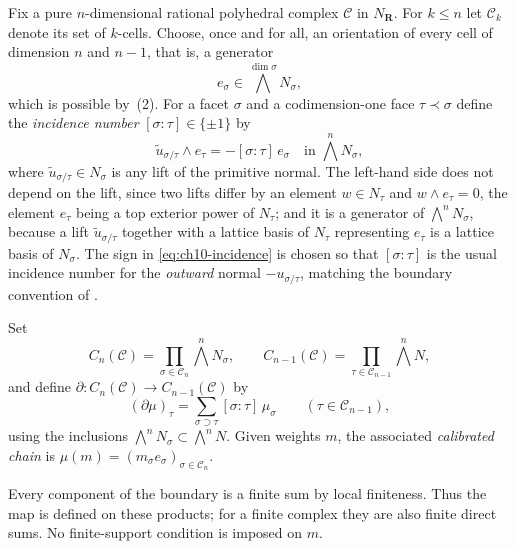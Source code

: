 Fix a pure $n$-dimensional rational polyhedral complex $\mathscr C$ in
$N_{\mathbf R}$.  For $k\leq n$ let $\mathscr C_k$ denote its set of
$k$-cells.  Choose, once and for all, an orientation of every cell of
dimension $n$ and $n-1$, that is, a generator
\[
                  e_\sigma\in\textstyle\bigwedge^{\dim\sigma}N_\sigma,
\]
which is possible by \,(2).  For a facet
$\sigma$ and a codimension-one face $\tau\prec\sigma$ define the
\emph{incidence number} $[\sigma:\tau]\in\{\pm1\}$ by
\begin{equation}
\label{eq:ch10-incidence}
 \widetilde u_{\sigma/\tau}\wedge e_\tau
 =-[\sigma:\tau]\,e_\sigma
 \quad\text{in }\textstyle\bigwedge^nN_\sigma,
\end{equation}
where $\widetilde u_{\sigma/\tau}\in N_\sigma$ is any lift of the primitive
normal.  The left-hand side does not depend on the lift, since two lifts
differ by an element $w\in N_\tau$ and $w\wedge e_\tau=0$, the element
$e_\tau$ being a top exterior power of $N_\tau$; and it is a generator of
$\bigwedge^nN_\sigma$,
because a lift $\widetilde u_{\sigma/\tau}$ together with a lattice basis of
$N_\tau$ representing $e_\tau$ is a lattice basis of $N_\sigma$.  The sign in
\eqref{eq:ch10-incidence} is chosen so that $[\sigma:\tau]$ is the usual
incidence number for the \emph{outward} normal $-u_{\sigma/\tau}$, matching
the boundary convention of .

\begin{definition}
\label{def:ch10-calibrated-chain}
Set
\[
 C_n(\mathscr C)=\prod_{\sigma\in\mathscr C_n}\textstyle\bigwedge^nN_\sigma,
 \qquad
 C_{n-1}(\mathscr C)=\prod_{\tau\in\mathscr C_{n-1}}\textstyle\bigwedge^nN,
\]
and define $\partial:C_n(\mathscr C)\to C_{n-1}(\mathscr C)$ by
\begin{equation}
\label{eq:ch10-boundary}
 (\partial\mu)_\tau
 =\sum_{\sigma\supset\tau}[\sigma:\tau]\,\mu_\sigma
 \qquad(\tau\in\mathscr C_{n-1}),
\end{equation}
using the inclusions $\bigwedge^nN_\sigma\subset\bigwedge^nN$.  Given weights
$m$, the associated \emph{calibrated chain} is
$\mu(m)=(m_\sigma e_\sigma)_{\sigma\in\mathscr C_n}$.
\end{definition}

Every component of the boundary is a finite sum by local finiteness.
Thus the map is defined on these products; for a finite complex they are
also finite direct sums. No finite-support condition is imposed on $m$.

